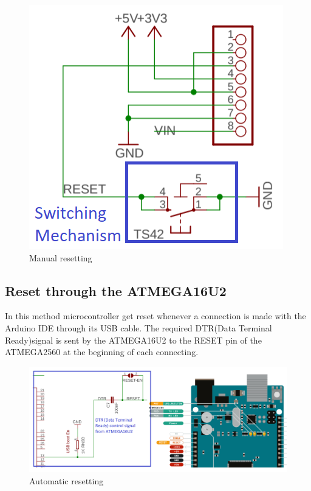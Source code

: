 \documentclass[a4paper,11pt,twocolumn]{article}
\begin{document}
\begin{center}
	\begin{figure}[!h]
		\centering
		\includegraphics[scale=0.5]{figures/capture}
		\caption{Manual resetting\cite{arduino}}
	\end{figure}
\end{center}




\subsection{Reset through the ATMEGA16U2}

In this method microcontroller get reset whenever a connection is made with the Arduino IDE through its USB cable. The required DTR(Data Terminal Ready)signal is sent by the ATMEGA16U2 to the RESET pin of the ATMEGA2560 at the beginning of each connecting.
\begin{center}
	\begin{figure}[!h]
		\centering
		\includegraphics[scale=0.3]{figures/SOFT}
		\caption{Automatic resetting\cite{arduino}}
	\end{figure}
\end{center}


{\scriptsize

 }	
\end{document}
